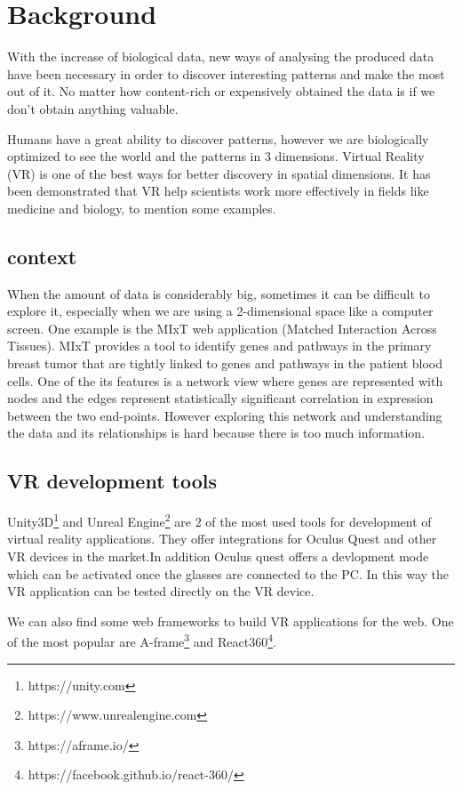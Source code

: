 \section{Background}
With the increase of biological data, new ways of analysing the produced data have been necessary in order to discover interesting patterns  and make the most out of it. No matter how content-rich or expensively obtained the data is if we don’t obtain anything valuable.

Humans have a great ability to discover patterns, however we are biologically optimized to see the world and the patterns in 3 dimensions. Virtual Reality (VR) is one of the best ways for better discovery in spatial dimensions. It has been demonstrated that VR help scientists work more effectively in fields like medicine \cite{Laver11}\cite{xia_ip_samman_wong_gateno_wang_yeung_kot_tideman_2001} and biology\cite{10.1093/bioinformatics/bti581}, to mention some examples.

\subsection{context}
When the amount of data is considerably big, sometimes it can be difficult to explore it, especially when we are using a 2-dimensional space like a computer screen. One example is the MIxT web application (Matched Interaction Across Tissues)\cite{fjukstad_dumeaux_olsen_lund_hallett_bongo_2017}\cite{dumeaux_fjukstad_interactions_tumor_blood}. MIxT provides a tool to identify genes and pathways in the primary breast tumor that are tightly linked to genes and pathways in the patient blood cells\cite{dumeaux_fjukstad_interactions_tumor_blood}. One of the its features is a network view where genes are represented with nodes and the edges represent statistically significant correlation in expression between the two end-points. However exploring this network and understanding the data and its relationships is hard because there is too much information.

\subsection{VR development tools}
Unity3D\footnote{https://unity.com} and Unreal Engine\footnote{https://www.unrealengine.com} are 2 of the most used tools for development of virtual reality applications. They offer integrations for Oculus Quest and other VR devices in the market.In addition Oculus quest offers a devlopment mode which can be activated once the glasses are connected to the PC. In this way the VR application can be tested directly on the VR device.

We can also find some web frameworks to build VR applications for the web. One of the most popular are A-frame\footnote{https://aframe.io/} and React360\footnote{https://facebook.github.io/react-360/}.
